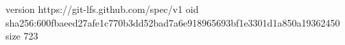version https://git-lfs.github.com/spec/v1
oid sha256:600fbaeed27afe1c770b3dd52bad7a6e918965693bf1e3301d1a850a19362450
size 723
